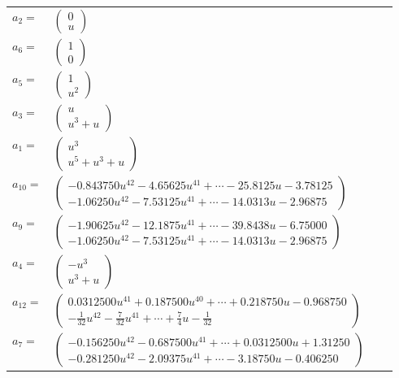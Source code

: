 \documentclass[1p]{elsarticle_modified}
\theoremstyle{definition}
\begin{document}
\begin{tabular}{m{7pt} m{180pt} m{7pt} m{180pt} }
\flushright $a_{2}=$&$\begin{pmatrix}0\\u\end{pmatrix}$ \\
\flushright $a_{6}=$&$\begin{pmatrix}1\\0\end{pmatrix}$ \\
\flushright $a_{5}=$&$\begin{pmatrix}1\\u^2\end{pmatrix}$ \\
\flushright $a_{3}=$&$\begin{pmatrix}u\\u^3+u\end{pmatrix}$ \\
\flushright $a_{1}=$&$\begin{pmatrix}u^3\\u^5+u^3+u\end{pmatrix}$ \\
\flushright $a_{10}=$&$\begin{pmatrix}-0.843750 u^{42}-4.65625 u^{41}+\cdots-25.8125 u-3.78125\\-1.06250 u^{42}-7.53125 u^{41}+\cdots-14.0313 u-2.96875\end{pmatrix}$ \\
\flushright $a_{9}=$&$\begin{pmatrix}-1.90625 u^{42}-12.1875 u^{41}+\cdots-39.8438 u-6.75000\\-1.06250 u^{42}-7.53125 u^{41}+\cdots-14.0313 u-2.96875\end{pmatrix}$ \\
\flushright $a_{4}=$&$\begin{pmatrix}- u^3\\u^3+u\end{pmatrix}$ \\
\flushright $a_{12}=$&$\begin{pmatrix}0.0312500 u^{41}+0.187500 u^{40}+\cdots+0.218750 u-0.968750\\-\frac{1}{32} u^{42}-\frac{7}{32} u^{41}+\cdots+\frac{7}{4} u-\frac{1}{32}\end{pmatrix}$ \\
\flushright $a_{7}=$&$\begin{pmatrix}-0.156250 u^{42}-0.687500 u^{41}+\cdots+0.0312500 u+1.31250\\-0.281250 u^{42}-2.09375 u^{41}+\cdots-3.18750 u-0.406250\end{pmatrix}$ \\

\end{tabular}
\end{document}
